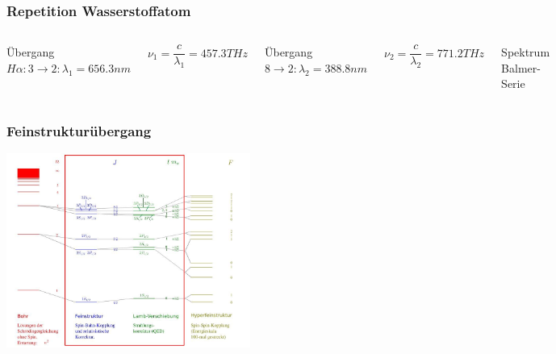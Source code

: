 \begin{frame}
	\frametitle{Repetition Wasserstoffatom}
	\begin{columns}

	Übergang $H\alpha: 3 \rightarrow 2: \lambda_1 = 656.3nm$
		 	
		 	$\nu_1 = \dfrac{c}{\lambda_1} = 457.3 THz $
		 	\vspace{.5cm}
		 	
		 	Übergang $8 \rightarrow 2: \lambda_2 = 388.8nm$
		 	
		 	$\nu_2 = \dfrac{c}{\lambda_2} = 771.2 THz$

	
	Spektrum Balmer-Serie

	\includegraphics[width = 5cm]{./pictures/wasserstoffSpektrum}
				
	\end{columns}
\end{frame}


\begin{frame}
	\frametitle {Feinstrukturübergang}

	\begin{center}
		\includegraphics[width = 8cm]{./pictures/energieniveaus2}
	\end{center}
	
\end{frame}


